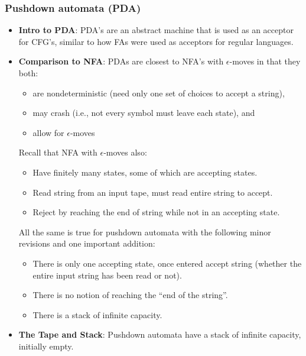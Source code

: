 \documentclass{report}
\begin{document}
    \pagebreak 
    \subsubsection{Pushdown automata (PDA)}
    \begin{itemize}
        \item \textbf{Intro to PDA}: PDA's are an abstract machine that is used as an acceptor for CFG's, similar to how FAs were used as acceptors for regular languages.
        \item \textbf{Comparison to NFA}: PDAs are closest to NFA’s with $\epsilon$-moves in that they both:
            \begin{itemize}
                \item are nondeterministic (need only one set of choices to accept a string),
                \item may crash (i.e., not every symbol must leave each state), and
                \item allow for $\epsilon$-moves
            \end{itemize}
            Recall that NFA with $\epsilon$-moves also:
            \begin{itemize}
                \item                 Have finitely many states, some of which are accepting states.
                \item                 Read string from an input tape, must read entire string to accept.
                \item                 Reject by reaching the end of string while not in an accepting state.
            \end{itemize}
            All the same is true for pushdown automata with the following minor revisions and one important addition:
            \begin{itemize}
                \item \relax [revision] There is only one accepting state, once entered accept string (whether the entire input string has been read or not).
                \item \relax [revision] There is no notion of reaching the “end of the string”.
                \item \relax [addition] There is a stack of infinite capacity.
            \end{itemize}
        \item \textbf{The Tape and Stack}: Pushdown automata have a stack of infinite capacity, initially empty.

\end{itemize}
\end{document}
